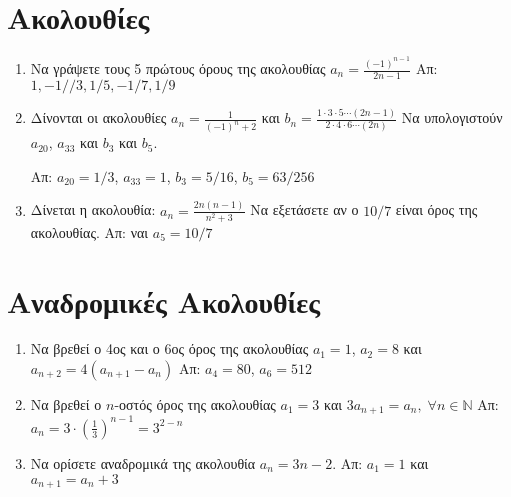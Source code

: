 



\everymath{\displaystyle}

\pagestyle{askhseis}




\begin{center}
  \minibox{\large\bfseries \textcolor{Col1}{Ασκήσεις στις Ακολουθίες}}
\end{center}

\vspace{\baselineskip}



\section*{Ακολουθίες}

\begin{enumerate}
  \item Να γράψετε τους 5 πρώτους όρους της ακολουθίας
    $
      a_{n} = \frac{(-1)^{n-1}}{2n-1} 
    $ 
    \hfill Απ: $1,-1//3,1/5,-1/7,1/9$
  \item Δίνονται οι ακολουθίες 
    $
      a_{n} = \frac{1}{(-1)^{n}+2}$ και $b_{n} = \frac{1 \cdot 3
      \cdot 5 \cdots (2n-1)}{2\cdot 4 \cdot 6 \cdots (2n)}  
    $ 
    Να υπολογιστούν $ a_{20} $, $ a_{33} $ και $ b_{3} $ και $ b_{5} $.

    \hfill Απ:  $ a_{20} = 1/3 $, $ a_{33} = 1 $, $ b_{3} = 5/16 $, $ b_{5} = 63/256 $

  \item Δίνεται η ακολουθία:
    $
      a_{n}= \frac{2n (n-1)}{n^{2}+3}  
    $ 
    Να εξετάσετε αν ο $ 10/7 $ είναι όρος της ακολουθίας.
    \hfill Απ: ναι $ a_{5}=10/7 $ 
\end{enumerate}



\section*{Αναδρομικές Ακολουθίες}

\begin{enumerate}
  \item Να βρεθεί ο 4ος και ο 6ος όρος της ακολουθίας $ a_{1}=1 $, $ a_{2}=8 $ και 
    $ a_{n+2}=4(a_{n+1}-a_{n}) $
    \hfill Απ: $ a_{4}=80 $, $ a_{6}=512 $ 

  \item Να βρεθεί ο $n$-οστός όρος της ακολουθίας 
    $
      a_{1}=3 $ και $ 3a_{n+1} = a_{n}, \; \forall n \in \mathbb{N}
    $ 
    \hfill Απ: $ a_{n} = 3 \cdot \left(\frac{1}{3} \right)^{n-1} = 3^{2-n} $ 

  \item Να ορίσετε αναδρομικά της ακολουθία $ a_{n} = 3n-2 $.
    \hfill Απ: $ a_{1}=1 $ και $ a_{n+1}=a_{n}+3 $ 
\end{enumerate}




